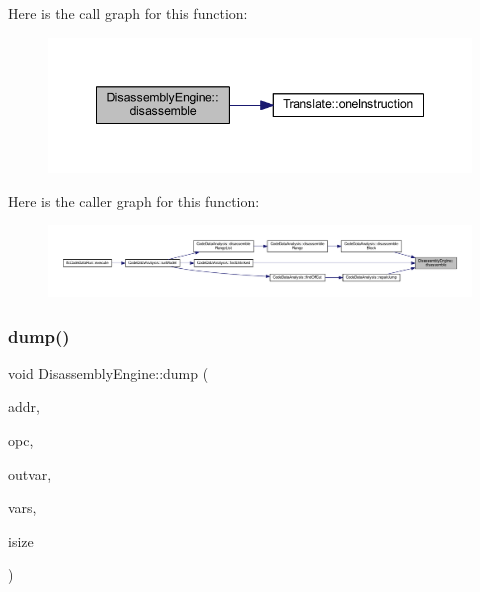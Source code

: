 Here is the call graph for this function\+:
\nopagebreak
\begin{figure}[H]
\begin{center}
\leavevmode
\includegraphics[width=348pt]{class_disassembly_engine_ad09a3d8b19efae613f8e45e59ccdd3e6_cgraph}
\end{center}
\end{figure}
Here is the caller graph for this function\+:
\nopagebreak
\begin{figure}[H]
\begin{center}
\leavevmode
\includegraphics[width=350pt]{class_disassembly_engine_ad09a3d8b19efae613f8e45e59ccdd3e6_icgraph}
\end{center}
\end{figure}
\mbox{\label{class_disassembly_engine_a33295e9d637ed2e437d3cbd6481eb20d}} 
\subsubsection{\texorpdfstring{dump()}{dump()}}
{\footnotesize\ttfamily void Disassembly\+Engine\+::dump (\begin{DoxyParamCaption}\item[{const \mbox{\hyperlink{class_address}{Address}} \&}]{addr,  }\item[{\mbox{\hyperlink{opcodes_8hh_abeb7dfb0e9e2b3114e240a405d046ea7}{Op\+Code}}}]{opc,  }\item[{\mbox{\hyperlink{struct_varnode_data}{Varnode\+Data}} $\ast$}]{outvar,  }\item[{\mbox{\hyperlink{struct_varnode_data}{Varnode\+Data}} $\ast$}]{vars,  }\item[{int4}]{isize }\end{DoxyParamCaption})\hspace{0.3cm}{\ttfamily [virtual]}}



